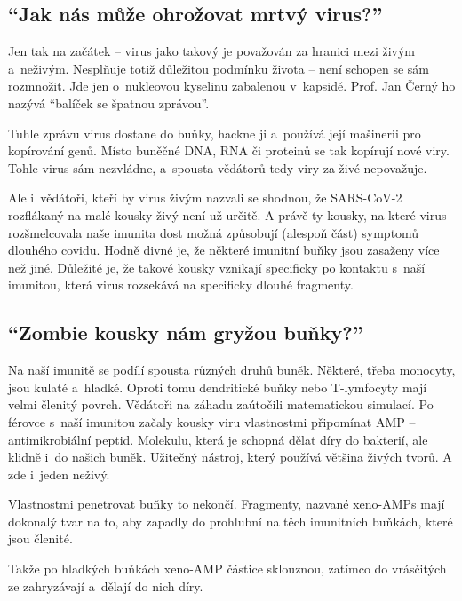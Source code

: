 \documentclass[main.tex]{subfiles}
\begin{document}
\subsection*{\enquote{Jak nás může ohrožovat mrtvý virus?}}
Jen tak na začátek – virus jako takový je považován za hranici mezi živým a~neživým. Nesplňuje totiž důležitou podmínku života – není schopen se sám rozmnožit. Jde jen o~nukleovou kyselinu zabalenou v~kapsidě. Prof. Jan Černý ho nazývá “balíček se špatnou zprávou”.\par
Tuhle zprávu virus dostane do buňky, hackne ji a~používá její mašinerii pro kopírování genů. Místo buněčné DNA, RNA či proteinů se tak kopírují nové viry. Tohle virus sám nezvládne, a~spousta vědátorů tedy viry za živé nepovažuje. \par
Ale i~vědátoři, kteří by virus živým nazvali se shodnou, že SARS-CoV-2 rozflákaný na malé kousky živý není už určitě. A právě ty kousky, na které virus rozšmelcovala naše imunita dost možná způsobují (alespoň část) symptomů dlouhého covidu. Hodně divné je, že některé imunitní buňky jsou zasaženy více než jiné. Důležité je, že takové kousky vznikají specificky po kontaktu s~naší imunitou, která virus rozsekává na specificky dlouhé fragmenty.
\subsection*{\enquote{Zombie kousky nám gryžou buňky?}}
Na naší imunitě se podílí spousta různých druhů buněk. Některé, třeba monocyty, jsou kulaté a~hladké. Oproti tomu dendritické buňky nebo T-lymfocyty mají velmi členitý povrch. Vědátoři na záhadu zaútočili matematickou simulací. Po férovce s~naší imunitou začaly kousky viru vlastnostmi připomínat AMP – antimikrobiální peptid. Molekulu, která je schopná dělat díry do bakterií, ale klidně i~do našich buněk. Užitečný nástroj, který používá většina živých tvorů. A zde i~jeden neživý.\par
Vlastnostmi penetrovat buňky to nekončí. Fragmenty, nazvané xeno-AMPs mají dokonalý tvar na to, aby zapadly do prohlubní na těch imunitních buňkách, které jsou členité. \par
Takže po hladkých buňkách xeno-AMP částice sklouznou, zatímco do vrásčitých ze zahryzávají a~dělají do nich díry.
\end{document}
